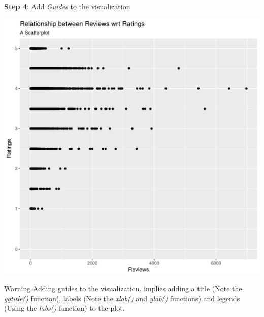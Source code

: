 \documentclass[12pt]{book}\usepackage{knitr}
\begin{document}
\newpage
\noindent \textbf{\Large \underline{Step 4}}: {\Large Add \emph{Guides} to the visualization} 
\begin{knitrout}
\color{fgcolor}\begin{kframe}
\begin{alltt}
 \hlkwb{<-}  \hlopt{+}
\hlstd{(} \hlstd{,}
            \hlstd{=}  \hlstd{)} \hlopt{+}
\hlstd{(}\hlstd{)} \hlopt{+} \hlstd{(}\hlstd{)}
\end{alltt}
\end{kframe}
\includegraphics[width=\maxwidth]{figure/add_guides-1} 

\end{knitrout}

\begin{DIY}{Warning}
\noindent Adding guides to the visualization, implies adding  a title (Note the \emph{ggtitle()} function), labels (Note the \emph{xlab()} and \emph{ylab()} functions) and legends (Using the \emph{labs()} function) to the plot. 
\end{DIY}
\end{document}
